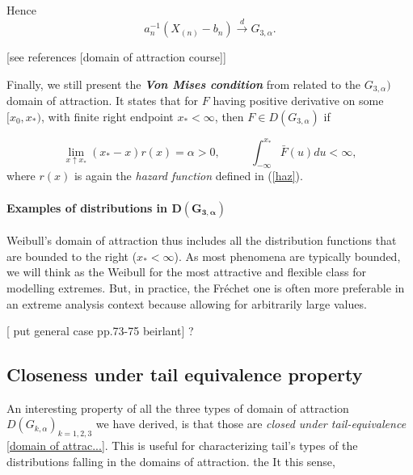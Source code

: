 \documentclass[11pt,a4paper,openany ]{book}
\begin{document}
Hence
\begin{equation*}
a^{-1}_n(X_{(n)}-b_n)\stackrel{d}{\rightarrow}G_{3,\alpha}.
\end{equation*}

[see references [domain of attraction course]]

Finally, we still present the \emph{\textbf{Von Mises condition}} from \cite{falk_von_1993} related to the $G_{3,\alpha})$ domain of attraction. It states that for $F$ having positive derivative on some $[x_0,x_*)$, with finite right endpoint $x_*<\infty$, then $F\in D(G_{3,\alpha})$ if

\begin{equation}
\displaystyle{\lim_{ x  \uparrow  x_*}}(x_*-x)r(x)=\alpha >0, \ \ \ \ \ \ \ \ \ \     \ \
\int^{x_*}_{-\infty} \bar{F}(u)du<\infty,
\end{equation}
where $r(x)$ is again the \emph{hazard function} defined in (\ref{haz}).

\paragraph{Examples of distributions in $\boldsymbol{D(G_{3,\alpha})}$} Weibull's domain of attraction thus includes all the distribution functions that are bounded to the right ($x_*<\infty$). As most phenomena are typically bounded, we will think as the Weibull for the most attractive and flexible class for modelling extremes. But, in practice, the Fréchet one is often more preferable in an extreme analysis context because allowing for arbitrarily large values.
\newline


[ put general case pp.73-75 beirlant] ?
\newline

\subsection{Closeness under tail equivalence property} An interesting property of all the three types of domain of attraction $D(G_{k,\alpha})_{k=1,2,3}$ we have derived, is that those are \emph{closed under tail-equivalence} \ref{domain of attrac...}. This is useful for characterizing tail's types of the distributions falling in the domains of attraction. the  It this sense,
\end{document}
